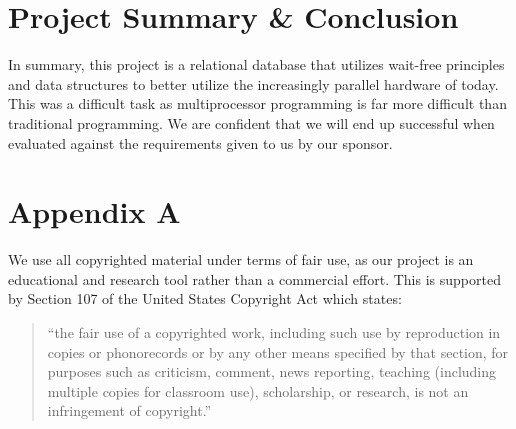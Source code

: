 \documentclass[letterpaper, 11pt]{article}
\begin{document}
\newpage

\section{Project Summary \& Conclusion}
In summary, this project is a relational database that utilizes wait-free principles and
data structures to better utilize the increasingly parallel hardware of today. This was a 
difficult task as multiprocessor programming is far more difficult than traditional
programming. We are confident that we will end up successful when evaluated against the 
requirements given to us by our sponsor.
\newpage



\newpage

\appendix
\section{Appendix A}
We use all copyrighted material under terms of fair use, as our project is an educational and research tool 
rather than a commercial effort. This is supported by Section 107 of the United States Copyright Act which states:
\begin{quotation}
``the fair use of a copyrighted work, including such use by reproduction in copies or phonorecords 
  or by any other means specified by that section, for purposes such as criticism, comment, news reporting, 
  teaching (including multiple copies for classroom use), scholarship, or research, is not an infringement 
  of copyright.''
\end{quotation}
\par\vspace{\baselineskip}
\end{document}
